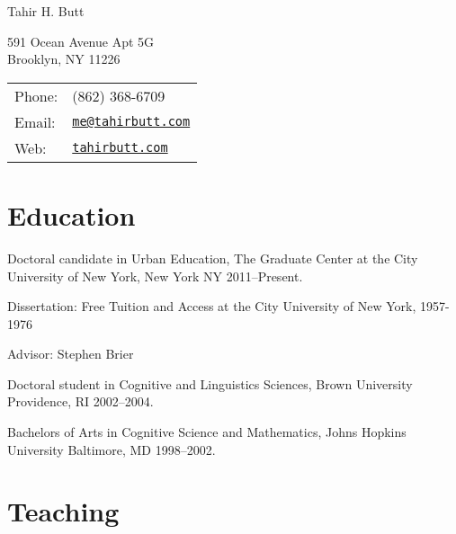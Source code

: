 \documentclass[letterpaper]{article}
\def\name{Tahir H. Butt}
\renewenvironment{itemize}{
  \begin{list}{}{
    \setlength{\leftmargin}{1.5em}
  }
}{
  \end{list}
}
\begin{document}
{\huge \name}


\vspace{0.25in}

\begin{minipage}{0.45\linewidth}
  591 Ocean Avenue Apt 5G \\
  Brooklyn, NY 11226
  \end{minipage}
\begin{minipage}{0.45\linewidth}
  \begin{tabular}{ll}
    Phone: & (862) 368-6709 \\
    Email: & \href{mailto:me@tahirbutt.com}{\tt me@tahirbutt.com} \\
    Web: & \href{http://tahirbutt.com}{\tt tahirbutt.com} \\
  \end{tabular}
\end{minipage}


\section*{Education}

\begin{itemize}
    \item Doctoral candidate in Urban Education, The Graduate Center at the City University of New York, New York NY 2011--Present.
    \begin{itemize}
        \item Dissertation: Free Tuition and Access at the City University of New York, 1957-1976
        \item Advisor: Stephen Brier
    \end{itemize}
    \item Doctoral student in Cognitive and Linguistics Sciences, Brown University Providence, RI 2002--2004.
    \item Bachelors of Arts in Cognitive Science and Mathematics, Johns Hopkins University Baltimore, MD 1998--2002.
\end{itemize}

\section*{Teaching}
\end{document}
